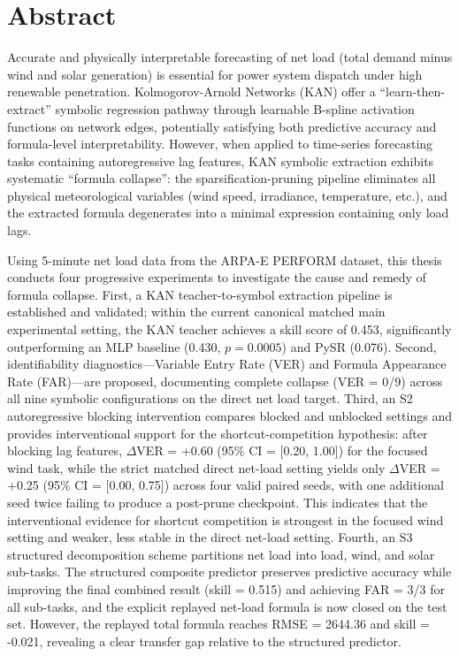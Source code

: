 \newpage

\chapter*{Abstract}

Accurate and physically interpretable forecasting of net load (total demand minus wind and solar generation) is essential for power system dispatch under high renewable penetration. Kolmogorov-Arnold Networks (KAN) offer a ``learn-then-extract'' symbolic regression pathway through learnable B-spline activation functions on network edges, potentially satisfying both predictive accuracy and formula-level interpretability. However, when applied to time-series forecasting tasks containing autoregressive lag features, KAN symbolic extraction exhibits systematic ``formula collapse'': the sparsification-pruning pipeline eliminates all physical meteorological variables (wind speed, irradiance, temperature, etc.), and the extracted formula degenerates into a minimal expression containing only load lags.

Using 5-minute net load data from the ARPA-E PERFORM dataset, this thesis conducts four progressive experiments to investigate the cause and remedy of formula collapse. First, a KAN teacher-to-symbol extraction pipeline is established and validated; within the current canonical matched main experimental setting, the KAN teacher achieves a skill score of 0.453, significantly outperforming an MLP baseline (0.430, $p=0.0005$) and PySR (0.076). Second, identifiability diagnostics---Variable Entry Rate (VER) and Formula Appearance Rate (FAR)---are proposed, documenting complete collapse (VER = 0/9) across all nine symbolic configurations on the direct net load target. Third, an S2 autoregressive blocking intervention compares blocked and unblocked settings and provides interventional support for the shortcut-competition hypothesis: after blocking lag features, $\Delta$VER = +0.60 (95\% CI = [0.20, 1.00]) for the focused wind task, while the strict matched direct net-load setting yields only $\Delta$VER = +0.25 (95\% CI = [0.00, 0.75]) across four valid paired seeds, with one additional seed twice failing to produce a post-prune checkpoint. This indicates that the interventional evidence for shortcut competition is strongest in the focused wind setting and weaker, less stable in the direct net-load setting. Fourth, an S3 structured decomposition scheme partitions net load into load, wind, and solar sub-tasks. The structured composite predictor preserves predictive accuracy while improving the final combined result (skill = 0.515) and achieving FAR = 3/3 for all sub-tasks, and the explicit replayed net-load formula is now closed on the test set. However, the replayed total formula reaches RMSE = 2644.36 and skill = -0.021, revealing a clear transfer gap relative to the structured predictor.

